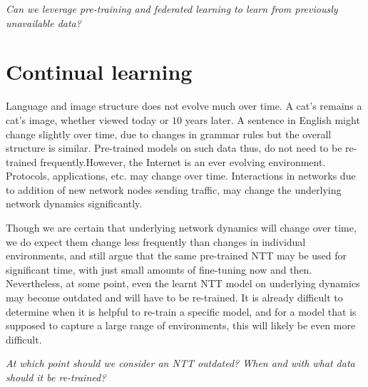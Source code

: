 \emph{Can we leverage pre-training and federated learning to learn from previously unavailable data?}

\section{Continual learning}
\label{sec:cont}

Language and image structure does not evolve much over time. A cat's remains a cat's image, whether viewed today or $10$ years later. A sentence in English might change slightly over time, due to changes in grammar rules but the overall structure is similar. Pre-trained models on such data thus, do not need to be re-trained frequently.However, the Internet is an ever evolving environment. Protocols, applications, etc. may change over time. Interactions in networks due to addition of new network nodes sending traffic, may change the underlying network dynamics significantly.

Though we are certain that underlying network dynamics will change over time, we do expect them change less frequently than changes in individual environments, and still argue that the same pre-trained NTT may be used for significant time, with just small amounts of fine-tuning now and then. Nevertheless, at some point, even the learnt NTT model on underlying dynamics may become outdated and will have to be re-trained. It is already difficult to determine when it is helpful to re-train a specific model\cite{puffer}, and for a model that is supposed to capture a large range of environments, this will likely be even more difficult.

\emph{At which point should we consider an NTT outdated? When and with what data should it be re-trained?}




